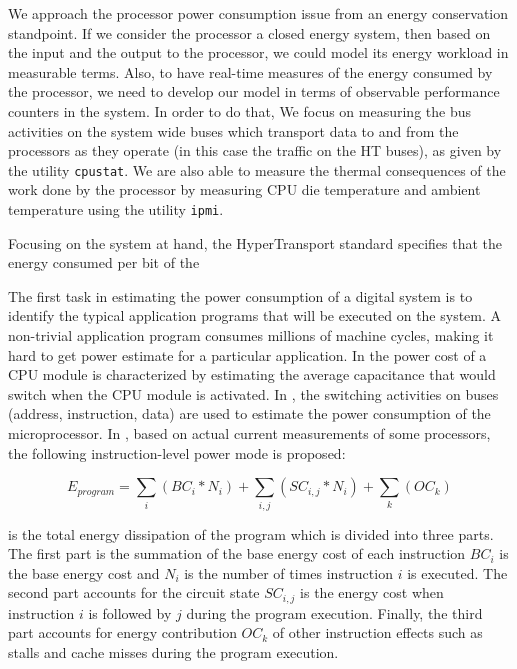 \documentclass[times, 10pt,onecolumn]{article}
\begin{document}
We approach the processor power consumption issue from an energy
conservation standpoint.  If we consider the processor a closed energy
system, then based on the input and the output to the processor, we
could model its energy workload in measurable terms. Also, to have
real-time measures of the energy consumed by the processor, we need to
develop our model in terms of observable performance counters in the
system. In order to do that, We focus on measuring the bus activities on
the system wide buses which transport data to and from the processors as
they operate (in this case the traffic on the HT buses), as given by the
utility \texttt{cpustat}. We are also able to measure the thermal
consequences of the work done by the processor by measuring CPU die
temperature and ambient temperature using the utility \texttt{ipmi}.

Focusing on the system at hand, the HyperTransport standard specifies
that the energy consumed per bit of the



The first task in estimating the power consumption of a digital system
is to identify the typical application programs that will be executed on
the system. A non-trivial application program consumes millions of
machine cycles, making it hard to get power estimate for a particular
application. In \cite{Sato1995} the power cost of a CPU module is
characterized by estimating the average capacitance that would switch
when the CPU module is activated. In \cite{Su1994} , the switching
activities on buses (address, instruction, data) are used to estimate
the power consumption of the microprocessor. In \cite{Tiwari1994}, based
on actual current measurements of some processors, the following
instruction-level power mode is proposed:

\begin{equation}
\label{eq:power_prog}
E_{program}=  \sum_i (BC_i*N_i) + \sum_{i,j} (SC_{i,j}*N_i) + \sum_k (OC_k)
\end{equation}
 
is the total energy dissipation of the program which is divided into
three parts. The first part is the summation of the base energy cost of
each instruction $BC_i$ is the base energy cost and $N_i$ is the number
of times instruction $i$ is executed. The second part accounts for the
circuit state $SC_{i,j}$ is the energy cost when instruction $i$ is
followed by $j$ during the program execution. Finally, the third part
accounts for energy contribution $OC_k$ of other instruction effects
such as stalls and cache misses during the program execution.
 
\end{document}

